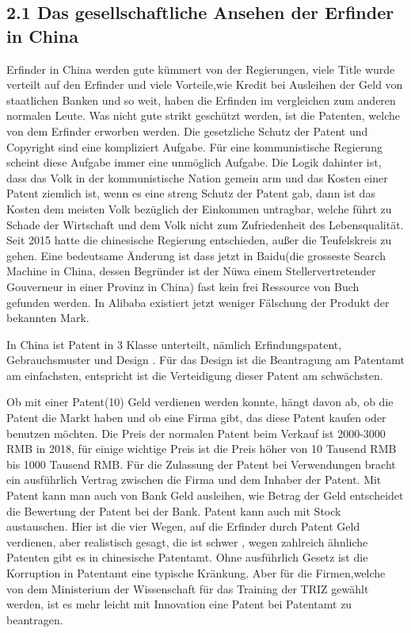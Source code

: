 \documentclass[11pt,a4paper]{article}
\begin{document}
\subsection{2.1 Das gesellschaftliche Ansehen der Erfinder in China}

Erfinder in China werden gute kümmert von der Regierungen, viele Title wurde
verteilt auf den Erfinder und viele Vorteile,wie Kredit bei Ausleihen der Geld
von staatlichen Banken und so weit, haben die Erfinden im vergleichen zum
anderen normalen Leute. Was nicht gute strikt geschützt werden, ist die
Patenten, welche von dem Erfinder erworben werden. Die gesetzliche Schutz der
Patent und Copyright sind eine kompliziert Aufgabe. Für eine kommunistische
Regierung scheint diese Aufgabe immer eine unmöglich Aufgabe. Die Logik
dahinter ist, dass das Volk in der kommunistische Nation gemein arm und das
Kosten einer Patent ziemlich ist, wenn es eine streng Schutz der Patent gab,
dann ist das Kosten dem meisten Volk bezüglich der Einkommen untragbar, welche
führt zu Schade der Wirtschaft und dem Volk nicht zum Zufriedenheit des
Lebensqualität. Seit 2015 hatte die chinesische Regierung entschieden, außer
die Teufelskreis zu gehen. Eine bedeutsame Änderung ist dass jetzt in
Baidu(die grosseste Search Machine in China, dessen Begründer ist der Nüwa
einem Stellervertretender Gouverneur in einer Provinz in China) fast kein frei
Ressource von Buch gefunden werden. In Alibaba existiert jetzt weniger
Fälschung der Produkt der bekannten Mark.

In China ist Patent in 3 Klasse unterteilt, nämlich Erfindungspatent,
Gebrauchsmuster und Design . Für das Design ist die Beantragung am Patentamt
am einfachsten, entspricht ist die Verteidigung dieser Patent am schwächsten.

Ob mit einer Patent(10) Geld verdienen werden konnte, hängt davon ab, ob die
Patent die Markt haben und ob eine Firma gibt, das diese Patent kaufen oder
benutzen möchten. Die Preis der normalen Patent beim Verkauf ist 2000-3000 RMB
in 2018, für einige wichtige Preis ist die Preis höher von 10 Tausend RMB bis
1000 Tausend RMB. Für die Zulassung der Patent bei Verwendungen bracht ein
ausführlich Vertrag zwischen die Firma und dem Inhaber der Patent. Mit Patent
kann man auch von Bank Geld ausleihen, wie Betrag der Geld entscheidet die
Bewertung der Patent bei der Bank. Patent kann auch mit Stock
austauschen. Hier ist die vier Wegen, auf die Erfinder durch Patent Geld
verdienen, aber realistisch gesagt, die ist schwer , wegen zahlreich ähnliche
Patenten gibt es in chinesische Patentamt. Ohne ausführlich Gesetz ist die
Korruption in Patentamt eine typische Kränkung. Aber für die Firmen,welche von
dem Ministerium der Wissenschaft für das Training der TRIZ gewählt werden,
ist es mehr leicht mit Innovation eine Patent bei Patentamt zu beantragen.
\end{document}
